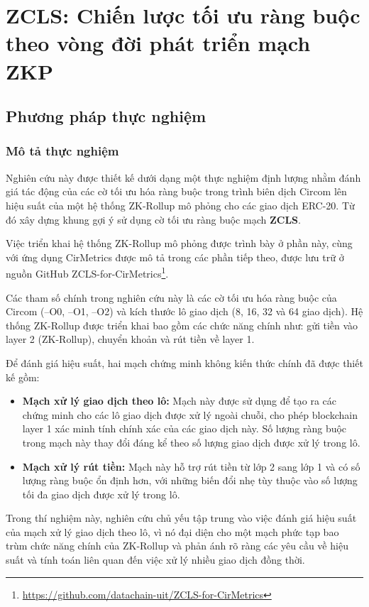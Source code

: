 \chapter{ZCLS: Chiến lược tối ưu ràng buộc theo vòng đời phát triển mạch ZKP}
\label{chap:chap4}
\section{Phương pháp thực nghiệm}
\subsection{Mô tả thực nghiệm}
Nghiên cứu này được thiết kế dưới dạng một thực nghiệm định lượng nhằm đánh giá tác động của các cờ tối ưu hóa ràng buộc trong trình biên dịch Circom lên hiệu suất của một hệ thống ZK-Rollup mô phỏng cho các giao dịch ERC-20. Từ đó 
xây dựng khung gợi ý sử dụng cờ tối ưu ràng buộc mạch \textbf{ZCLS}.

Việc triển khai hệ thống ZK-Rollup mô phỏng được trình bày ở phần này, cùng với ứng dụng CirMetrics được mô tả trong các phần tiếp theo, được lưu trữ ở nguồn GitHub ZCLS-for-CirMetrics\footnote{\url{https://github.com/datachain-uit/ZCLS-for-CirMetrics}}.

Các tham số chính trong nghiên cứu này là các cờ tối ưu hóa ràng buộc của Circom (--O0, --O1, --O2) và kích thước lô giao dịch (8, 16, 32 và 64 giao dịch).
Hệ thống ZK-Rollup được triển khai bao gồm các chức năng chính như: gửi tiền vào layer 2 (ZK-Rollup), chuyển khoản và rút tiền về layer 1.

Để đánh giá hiệu suất, hai mạch chứng minh không kiến thức chính đã được thiết kế gồm:

\begin{itemize}
    \item \textbf{Mạch xử lý giao dịch theo lô:} Mạch này được sử dụng để tạo ra các chứng minh cho các lô giao dịch được xử lý ngoài chuỗi, cho phép blockchain layer 1 xác minh tính chính xác của các giao dịch này. Số lượng ràng buộc trong mạch này thay đổi đáng kể theo số lượng giao dịch được xử lý trong lô.
    \item \textbf{Mạch xử lý rút tiền:} Mạch này hỗ trợ rút tiền từ lớp 2 sang lớp 1 và có số lượng ràng buộc ổn định hơn, với những biến đổi nhẹ tùy thuộc vào số lượng tối đa giao dịch được xử lý trong lô.
\end{itemize}

Trong thí nghiệm này, nghiên cứu chủ yếu tập trung vào việc đánh giá hiệu suất của mạch xử lý giao dịch theo lô, vì nó đại diện cho một mạch phức tạp bao trùm chức năng chính của ZK-Rollup và phản ánh rõ ràng các yêu cầu về hiệu suất và tính toán liên quan đến việc xử lý nhiều giao dịch đồng thời.


